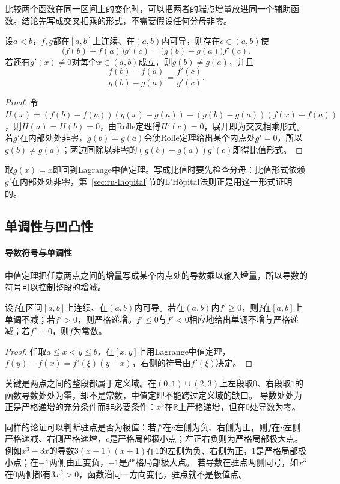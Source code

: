 比较两个函数在同一区间上的变化时，可以把两者的端点增量放进同一个辅助函数。结论先写成交叉相乘的形式，不需要假设任何分母非零。
\begin{theorem}[Cauchy中值定理]
\label{thm:analysis-cauchy-mean-value}
设$a<b$，$f,g$都在$[a,b]$上连续、在$(a,b)$内可导，则存在$c\in(a,b)$使
\[
 \bigl(f(b)-f(a)\bigr)g'(c)=\bigl(g(b)-g(a)\bigr)f'(c).
\]
若还有$g'(x)\neq0$对每个$x\in(a,b)$成立，则$g(b)\neq g(a)$，并且
\[
 \frac{f(b)-f(a)}{g(b)-g(a)}=\frac{f'(c)}{g'(c)}.
\]
\end{theorem}
\begin{proof}
令$H(x)=(f(b)-f(a))(g(x)-g(a))-(g(b)-g(a))(f(x)-f(a))$，则$H(a)=H(b)=0$，由Rolle定理得$H'(c)=0$，展开即为交叉相乘形式。
若$g'$在内部处处非零，$g(b)=g(a)$会使Rolle定理给出某个内点处$g'=0$，所以$g(b)\neq g(a)$；两边同除以非零的$(g(b)-g(a))g'(c)$即得比值形式。
\end{proof}
取$g(x)=x$即回到Lagrange中值定理。写成比值时要先检查分母：比值形式依赖$g'$在内部处处非零，第~\ref{sec:ru-lhopital}节的L'Hôpital法则正是用这一形式证明的。

\subsection{单调性与凹凸性}
\label{sec:ru-monotonicity-convexity}
\label{sec:analysis-monotonicity}

\paragraph{导数符号与单调性}
中值定理把任意两点之间的增量写成某个内点处的导数乘以输入增量，所以导数的符号可以控制整段的增减。
\begin{theorem}[导数符号与单调性]
\label{thm:analysis-derivative-monotonicity}
设$f$在区间$[a,b]$上连续、在$(a,b)$内可导。若在$(a,b)$内$f'\geq0$，则$f$在$[a,b]$上单调不减；若$f'>0$，则严格递增。$f'\leq0$与$f'<0$相应地给出单调不增与严格递减；若$f'\equiv0$，则$f$为常数。
\end{theorem}
\begin{proof}
任取$a\leq x<y\leq b$，在$[x,y]$上用Lagrange中值定理，$f(y)-f(x)=f'(\xi)(y-x)$，右侧的符号由$f'(\xi)$决定。
\end{proof}
关键是两点之间的整段都属于定义域。在$(0,1)\cup(2,3)$上左段取$0$、右段取$1$的函数导数处处为零，却不是常数，中值定理不能跨过定义域的缺口。
导数处处为正是严格递增的充分条件而非必要条件：$x^3$在$\mathbb R$上严格递增，但在$0$处导数为零。

同样的论证可以判断驻点是否为极值：若$f'$在$c$左侧为负、右侧为正，则$f$在$c$左侧严格递减、右侧严格递增，$c$是严格局部极小点；左正右负则为严格局部极大点。
例如$x^3-3x$的导数$3(x-1)(x+1)$在$1$的左侧为负、右侧为正，$1$是严格局部极小点；在$-1$两侧由正变负，$-1$是严格局部极大点。
若导数在驻点两侧同号，如$x^3$在$0$两侧都有$3x^2>0$，函数沿同一方向变化，驻点就不是极值点。

